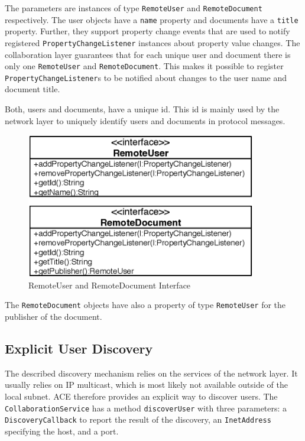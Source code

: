 The parameters are instances of type \texttt{Remote\-User} and
\texttt{Remote\-Document} respectively. The user objects have a \texttt{name}
property and documents have a \texttt{title} property. Further, they support
property change events that are used to notify registered 
\texttt{Property\-Change\-Listener} instances about property value changes. 
The collaboration layer guarantees that for each unique user and document
there is only one \texttt{Remote\-User} and \texttt{Remote\-Document}. 
This makes
it possible to register \texttt{Property\-Change\-Listener}s to be 
notified about changes to the user name and document title. 

Both, users and documents, have a unique id. This id is mainly used by the
network layer to uniquely identify users and documents in protocol messages.

\begin{figure}[H]
 \centering
 \includegraphics[width=10.05cm,height=6.35cm]{../images/finalreport/architecture_userdocument_uml.eps}
 \caption{RemoteUser and RemoteDocument Interface}
\end{figure}

The \texttt{Remote\-Document} objects have also a property of type
\texttt{Remote\-User} for the publisher of the document.


\subsection{Explicit User Discovery}
The described discovery mechanism relies on the services of the network layer.
It usually relies on IP multicast, which is most likely not available outside
of the local subnet. ACE therefore provides an explicit way to discover users.
The \texttt{Collaboration\-Service} has a method \texttt{discover\-User} with
three parameters: a \texttt{Discovery\-Callback} to report the result
of the discovery, an \texttt{Inet\-Address} specifying the host, and a port.

